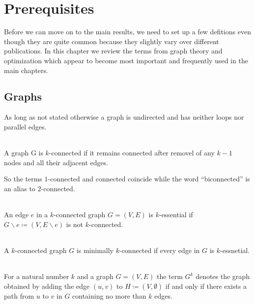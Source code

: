 \chapter{Prerequisites}
Before we can move on to the main results, we need to set up a few defitions even though they are quite common because they slightly vary over different publications. In this chapter we review the terms from graph theory and optimization which appear to become most important and frequently used in the main chapters.

\section{Graphs}
As long as not stated otherwise a graph is undirected and has neither loops nor parallel edges.

\begin{definition} [\(k\)-connected]\label{def:k_connected}\ \\
  A graph G is \(k\)-connected if it remains connected after removel of any \(k-1\) nodes and all their adjacent edges.
\end{definition}

So the terms \(1\)-connected and connected coincide while the word \enquote{biconnected} is an alias to \(2\)-connected.

\begin{definition} [\(k\)-essential]\label{def:k_essential}\ \\
  An edge \(e\) in a \(k\)-connected graph \(G = (V, E)\) is \(k\)-essential if \(G \backslash e \coloneqq (V, E \backslash e)\) is not \(k\)-connected.
\end{definition}

\begin{definition}\label{def:min_k_connected}\ \\
  A \(k\)-connected graph \(G\) is minimally \(k\)-connected if every edge in \(G\) is \(k\)-essnetial.
\end{definition}

\begin{definition}\label{def:power_of_graph}\ \\
  For a natural number \(k\) and a graph \(G = (V, E)\) the term \(G^{k}\) denotes the graph obtained by adding the edge \((u,v)\) to \(H \coloneqq (V, \emptyset)\) if and only if there exists a path from \(u\) to \(v\) in \(G\) containing no more than \(k\) edges.
\end{definition}

